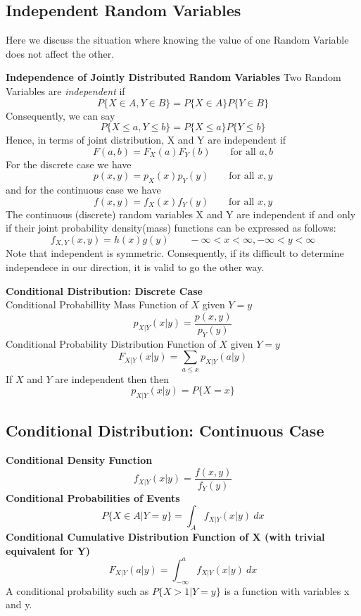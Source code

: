 \documentclass[10pt,a4paper]{article}
\begin{document}
     \subsection{Independent Random Variables}
     Here we discuss the situation where knowing the value of one Random Variable does not affect the other.
     \begin{framed}
     	\centering\textbf{Independence of Jointly Distributed Random Variables}
     	Two Random Variables are \emph{independent} if $$P\{X \in A, Y \in B\} = P\{X \in A\}P\{Y \in B\}$$ Consequently, we can say $$P\{X \leq a, Y \leq b\} = P\{X \leq a\}P\{Y \leq b\}$$ Hence, in terms of joint distribution, X and Y are independent if $$F(a,b) = F_{X}(a)F_{Y}(b) \qquad \text{for all } a,b$$ For the discrete case we have $$p(x,y) = p_{X}(x)p_{Y}(y) \qquad \text{for all } x,y$$ and for the continuous case we have $$f(x,y) = f_{X}(x)f_{Y}(y) \qquad \text{for all } x,y$$ The continuous (discrete) random variables X and Y are independent if and only if their joint probability density(mass) functions can be expressed as follows: $$f_{X,Y}(x,y) = h(x)g(y) \qquad -\infty < x < \infty, -\infty < y < \infty$$
     Note that independent is symmetric. Consequently, if its difficult to determine independece in our direction, it is valid to go the other way.
     \end{framed}
     \begin{framed}
     	\centering\textbf{Conditional Distribution: Discrete Case} \\
     	Conditional Probabillity Mass Function of $X$ given $Y=y$
     	$$p_{X|Y}(x|y) = \frac{p(x,y)}{p_{Y}(y)}$$
     	Conditional Probability Distribution Function of $X$ given $Y=y$
     	$$F_{X|Y}(x|y) = \sum_{a\leq x}p_{X|Y}(a|y)$$
     	If $X$ and $Y$ are independent then then $$p_{X|Y}(x|y) = P\{X=x\}$$
     \end{framed}
     \newpage 
     \subsection{Conditional Distribution: Continuous Case}
     \begin{framed}
     \centering\textbf{Conditional Density Function}
     $$f_{X|Y}(x|y) = \frac{f(x,y)}{f_{Y}(y)}$$
     \centering\textbf{Conditional Probabilities of Events}
     $$P\{X \in A | Y = y\} = \int_{A}f_{X|Y}(x|y)\ dx$$
     \centering\textbf{Conditional Cumulative Distribution Function of X (with trivial equivalent for Y)}
     $$F_{X|Y}(a|y) = \int_{-\infty}^{a}f_{X|Y}(x|y)\ dx$$
     A conditional probability such as $P\{X > 1 | Y = y\}$ is a function with variables x and y.
    \end{framed}
\end{document}
